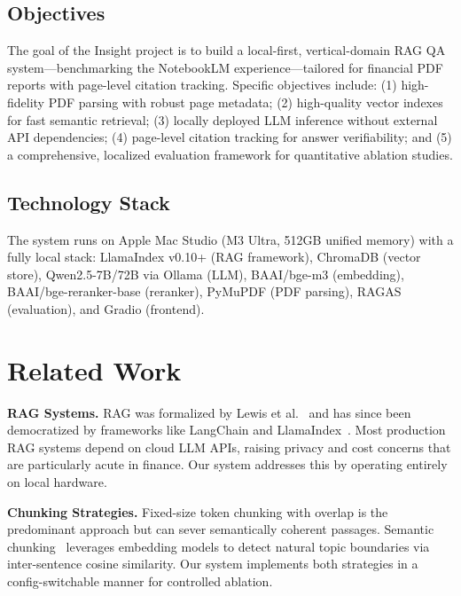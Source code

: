 \documentclass[11pt, a4paper]{article}
\begin{document}
\subsection{Objectives}

The goal of the Insight project is to build a local-first, vertical-domain RAG
QA system---benchmarking the NotebookLM experience---tailored for financial PDF
reports with page-level citation tracking. Specific objectives include: (1)
high-fidelity PDF parsing with robust page metadata; (2) high-quality vector
indexes for fast semantic retrieval; (3) locally deployed LLM inference without
external API dependencies; (4) page-level citation tracking for answer
verifiability; and (5) a comprehensive, localized evaluation framework for
quantitative ablation studies.

\subsection{Technology Stack}

The system runs on Apple Mac Studio (M3 Ultra, 512GB unified memory) with a
fully local stack: LlamaIndex v0.10+ (RAG framework), ChromaDB (vector store),
Qwen2.5-7B/72B via Ollama (LLM), BAAI/bge-m3 (embedding),
BAAI/bge-reranker-base (reranker), PyMuPDF (PDF parsing), RAGAS (evaluation),
and Gradio (frontend).

\section{Related Work}

\noindent\textbf{RAG Systems.} RAG was formalized by Lewis et al.~\cite{lewis2020} and has since been democratized by frameworks like LangChain and LlamaIndex~\cite{llamaindex}. Most production RAG systems depend on cloud LLM APIs, raising privacy and cost concerns that are particularly acute in finance. Our system addresses this by operating entirely on local hardware.

\noindent\textbf{Chunking Strategies.} Fixed-size token chunking with overlap is the predominant approach but can sever semantically coherent passages. Semantic chunking~\cite{bge} leverages embedding models to detect natural topic boundaries via inter-sentence cosine similarity. Our system implements both strategies in a config-switchable manner for controlled ablation.
\end{document}
